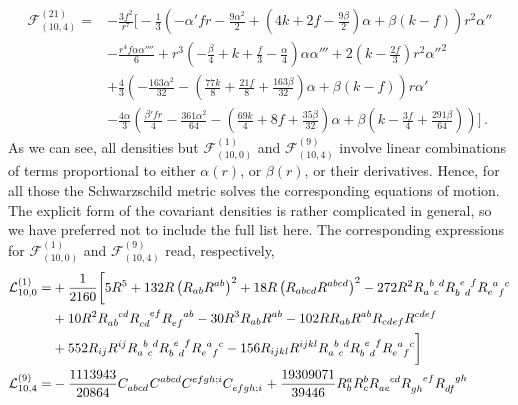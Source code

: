 \documentclass[11pt]{article}
\begin{document}
{\begin{align}
\mathcal{F}_{(10, 4)}^{(21)} =&-\frac{3f^2}{r^7}\bigg[-\frac{1}{3} \left( -\alpha' f r -\frac{9 \alpha^ 2}{2}+\left(4k+2f-\frac{9\beta}{2}\right)\alpha + \beta (k-f)\right)r^2\alpha''\\
& -\frac{r^4 f \alpha \alpha'''' }{6} +r^3  \left( -\frac{\beta}{4}+k+\frac{f}{3}-\frac{\alpha}{4}\right) \alpha \alpha''' +2\left(k-\frac{2f}{3}\right)r^2\alpha''^2\\
&+\frac{4}{3}\left(-\frac{163\alpha^2}{32}-\left(\frac{77k}{8}+\frac{21 f}{8}+\frac{163\beta}{32} \right)\alpha+\beta(k-f) \right)r \alpha'\\
&-\frac{4\alpha}{3} \left(\frac{\beta' f r}{4}-\frac{361 \alpha^2}{64}-\left(\frac{69k}{4}+8f+\frac{35\beta}{32} \right)\alpha+\beta \left(k-\frac{3f}{4}+\frac{291\beta}{64} \right) \right)\bigg]\, .
\end{align}
As we can see, all densities but $\mathcal{F}_{(10, 0)}^{(1)}$ and $\mathcal{F}_{(10, 4)}^{(9)}$ involve linear combinations of terms proportional to either $\alpha(r)$, or $\beta(r)$, or their derivatives. Hence, for all those the Schwarzschild metric solves the corresponding equations of motion. The explicit form of the covariant densities is rather complicated in general, so we have preferred not to include the full list here. The corresponding expressions for  $\mathcal{F}_{(10, 0)}^{(1)}$ and $\mathcal{F}_{(10, 4)}^{(9)}$ read, respectively,
\begin{align}
\mathcal{L}^{(1)}_{10, 0} =&+\frac{1}{2160} \bigg[5 R^5 + 132 R  \left( R_{ab} R^{ab} \right)^2 + 18 R \left(R_{abcd} R^{abcd} \right)^2 - 272 R^2 \tensor{R}{_a^b_c^d}\tensor{R}{_b^e_d^f} \tensor{R}{_e^a_f^c} 
\nonumber
\\
&+ 10 R^2 \tensor{R}{_{ab}^{cd}} \tensor{R}{_{cd}^{ef}} \tensor{R}{_{ef}^{ab}} - 30 R^3 R_{ab}R^{ab} - 102 R R_{ab} R^{ab} R_{cdef} R^{cdef} 
\nonumber
\\
&+ 552 R_{ij} R^{ij} \tensor{R}{_a^b_c^d}\tensor{R}{_b^e_d^f} \tensor{R}{_e^a_f^c} - 156 R_{ijkl} R^{ijkl} \tensor{R}{_a^b_c^d}\tensor{R}{_b^e_d^f} \tensor{R}{_e^a_f^c}\bigg]
\\
\mathcal{L}^{(9)}_{10, 4} =& -\frac{1113943}{20864} \tensor{C}{_{abcd}} \tensor{C}{^{abcd}}  \tensor{C}{^{efgh;i}} \tensor{C}{_{efgh;i}}
+ \frac{19309071}{39446} R_b^a R_c ^b \tensor{R}{_{ae}^{cd}} \tensor{R}{_{gh}^{ef}} \tensor{R}{_{df}^{gh}}  
\nonumber
\\

\end{align}}
\end{document}
